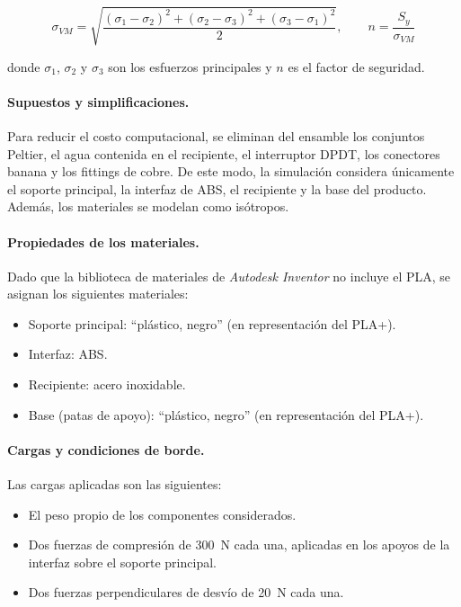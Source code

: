 \documentclass[12pt, a4paper]{article}
\begin{document}
\begin{equation}
    \sigma_{VM} = \sqrt{\frac{(\sigma_1 - \sigma_2)^2 + (\sigma_2 - \sigma_3)^2 + (\sigma_3 - \sigma_1)^2}{2}}, \qquad n = \frac{S_y}{\sigma_{VM}}
    \label{eq:von_mises}
\end{equation}

donde $\sigma_1$, $\sigma_2$ y $\sigma_3$ son los esfuerzos principales y $n$ es el factor de seguridad.

\paragraph{Supuestos y simplificaciones.} Para reducir el costo computacional, se eliminan del ensamble los conjuntos Peltier, el agua contenida en el recipiente, el interruptor DPDT, los conectores banana y los fittings de cobre. De este modo, la simulación considera únicamente el soporte principal, la interfaz de ABS, el recipiente y la base del producto. Además, los materiales se modelan como isótropos.

\paragraph{Propiedades de los materiales.} Dado que la biblioteca de materiales de \textit{Autodesk Inventor} no incluye el PLA, se asignan los siguientes materiales:

\begin{itemize}
    \item Soporte principal: ``plástico, negro'' (en representación del PLA+).
    \item Interfaz: ABS.
    \item Recipiente: acero inoxidable.
    \item Base (patas de apoyo): ``plástico, negro'' (en representación del PLA+).
\end{itemize}

\paragraph{Cargas y condiciones de borde.} Las cargas aplicadas son las siguientes:

\begin{itemize}
    \item El peso propio de los componentes considerados.
    \item Dos fuerzas de compresión de \SI{300}{\newton} cada una, aplicadas en los apoyos de la interfaz sobre el soporte principal.
    \item Dos fuerzas perpendiculares de desvío de \SI{20}{\newton} cada una.
\end{itemize}
\end{document}
